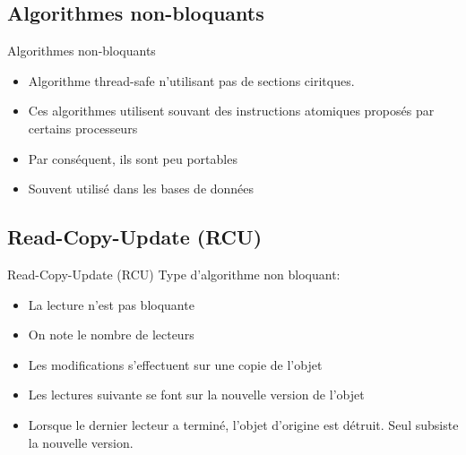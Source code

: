 \subsection{Algorithmes non-bloquants}

\begin{frame}{Algorithmes non-bloquants}
  \begin{itemize} 
  \item Algorithme thread-safe n'utilisant pas de sections ciritques.
  \item Ces  algorithmes utilisent souvant  des instructions atomiques
    proposés par certains processeurs
  \item Par conséquent, ils sont peu portables
  \item Souvent utilisé dans les bases de données
  \end{itemize} 
\end{frame} 

\subsection{Read-Copy-Update (RCU)}

\begin{frame}{Read-Copy-Update (RCU)}
  Type d'algorithme non bloquant:
  \begin{itemize} 
  \item La lecture n'est pas bloquante
  \item On note le nombre de lecteurs
  \item Les modifications s'effectuent sur une copie de l'objet
  \item Les lectures suivante se font sur la nouvelle version de l'objet
  \item Lorsque  le dernier lecteur  a terminé, l'objet  d'origine est
    détruit. Seul subsiste la nouvelle version.
  \end{itemize} 
\end{frame}

